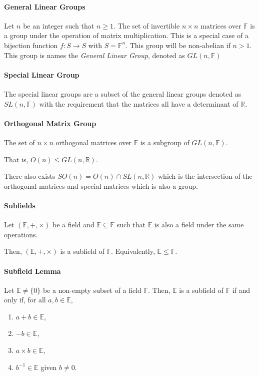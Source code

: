 \paragraph{General Linear Groups}
Let \(n\) be an integer such that \(n \geq 1\). The set of invertible
\(n\times n\) matrices over \(\mathbb{F}\) is a group under the operation
of matrix multiplication.
This is a special case of a bijection function \(f: S\to S\) with
\(S = \mathbb{F}^n\). This group will be non-abelian if \(n > 1\).
This group is names the \textit{General Linear Group}, denoted as
\(GL(n, \mathbb{F})\)

\paragraph{Special Linear Group}
The special linear groups are a subset of the general linear groups
denoted as \(SL(n, \mathbb{F})\) with the requirement that the matrices
all have a determinant of \(\mathbb{R}\).

\paragraph{Orthogonal Matrix Group}
The set of \(n\times n\) orthogonal matrices over \(\mathbb{F}\) is a subgroup of
\(GL(n, \mathbb{F})\).

That is, \(O(n) \leq GL(n, \mathbb{R})\).

There also exists \(SO(n) = O(n) \cap SL(n, \mathbb{R})\) which is the
intersection of the orthogonal matrices and special matrices which is also
a group.

\paragraph{Subfields}
Let \((\mathbb{F}, +, \times)\) be a field and
\(\mathbb{E}\subseteq \mathbb{F}\) such that \(\mathbb{E}\) is also a
field under the same operations.

Then, \((\mathbb{E}, +, \times)\) is a subfield of \(\mathbb{F}\).
Equivalently, \(\mathbb{E}\leq \mathbb{F}\).

\paragraph{Subfield Lemma}
Let \(\mathbb{E} \neq \{0\} \) be a non-empty subset of a field
\(\mathbb{F}\).
Then, \(\mathbb{E}\) is a subfield of \(\mathbb{F}\) if and only if,
for all \(a, b \in \mathbb{E}\),

\begin{enumerate}
    \item \(a + b \in \mathbb{E}\),
    \item \(- b \in \mathbb{E}\),
    \item \(a\times b \in \mathbb{E}\),
    \item \(b^{-1} \in \mathbb{E}\) given \(b \neq 0\).
\end{enumerate}

